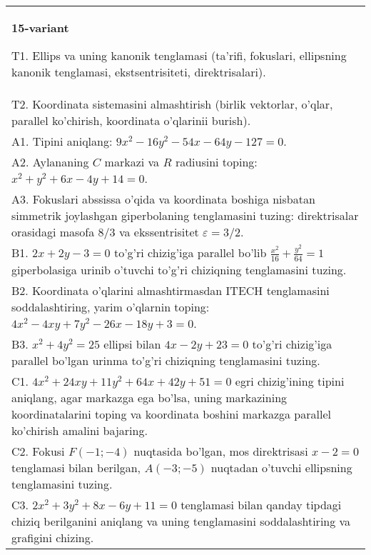 \documentclass{article}
\begin{document}
\begin{tabular}{m{17cm}}
\textbf{15-variant}
\newline

T1. Ellips va uning kanonik tenglamasi (ta'rifi, fokuslari, ellipsning kanonik tenglamasi, ekstsentrisiteti, direktrisalari).\\

T2. Koordinata sistemasini almashtirish (birlik vektorlar, o'qlar, parallel ko'chirish, koordinata o'qlarinii burish).\\

A1. Tipini aniqlang: $9x^{2}-16y^{2}-54x-64y-127=0$.\\

A2. Aylananing $C$ markazi va $R$ radiusini toping: $x^2+y^2+6x-4y+14=0$.\\

A3. Fokuslari abssissa o'qida va koordinata boshiga nisbatan simmetrik joylashgan giperbolaning tenglamasini tuzing: direktrisalar orasidagi masofa $8/3$ va ekssentrisitet $\varepsilon=3/2$.\\

B1. $2x + 2y - 3 = 0$ to'g'ri chizig'iga parallel bo'lib $\frac{x^{2}}{16} + \frac{y^{2}}{64} = 1$ giperbolasiga urinib o'tuvchi to'g'ri chiziqning tenglamasini tuzing.  \\

B2. Koordinata o'qlarini almashtirmasdan ITECH tenglamasini soddalashtiring, yarim o'qlarnin toping: $4x^{2} - 4xy + 7y^{2} - 26x - 18y + 3 = 0$.\\

B3. $x^{2} + 4y^{2} = 25$ ellipsi bilan $4x - 2y + 23 = 0$ to'g'ri chizig'iga parallel bo'lgan urinma to'g'ri chiziqning tenglamasini tuzing.  \\

C1. $4x^{2} + 24xy + 11y^{2} + 64x + 42y + 51 = 0$ egri chizig'ining tipini aniqlang, agar markazga ega bo'lsa, uning markazining koordinatalarini toping va koordinata boshini markazga parallel ko'chirish amalini bajaring.\\

C2. Fokusi $F( - 1; - 4)$ nuqtasida bo'lgan, mos direktrisasi $x - 2 = 0$ tenglamasi bilan berilgan, $A( - 3; - 5)$ nuqtadan o'tuvchi ellipsning tenglamasini tuzing.  \\

C3. $2x^{2} + 3y^{2} + 8x - 6y + 11 = 0$ tenglamasi bilan qanday tipdagi chiziq berilganini aniqlang va uning tenglamasini soddalashtiring va grafigini chizing.  \\

\end{tabular}
\vspace{1cm}
\end{document}
